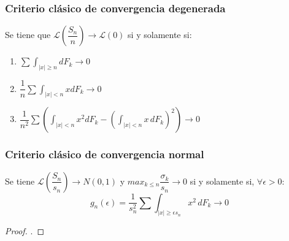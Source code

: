 \subsubsection{Criterio clásico de convergencia degenerada}
Se tiene que $\mathcal{L} \left( \dfrac{S_n}{n} \right)\rightarrow \mathcal{L}(0)$ si y solamente si:
\begin{enumerate}
\item $\sum\displaystyle\int_{|x|\geq n}dF_k \rightarrow 0$
\item $\dfrac{1}{n}\sum\displaystyle\int_{|x|<n} x dF_k \rightarrow 0$
\item $\dfrac{1}{n^2}\sum\left( \displaystyle\int_{|x|<n}x^2 dF_k - \left(  \displaystyle\int_{|x|<n}x\, dF_k \right)^2 \right)\longrightarrow 0$
\end{enumerate}
\subsubsection{Criterio clásico de convergencia normal}
Se tiene $\mathcal{L} \left( \dfrac{S_n}{s_n} \right)\rightarrow N(0,1)$ y $max_{k\leq n}\dfrac{\sigma_k}{s_n}\rightarrow 0$ si y solamente si, $\forall \epsilon >0$:
$$g_n(\epsilon)=\dfrac{1}{s_n^2}\sum\int_{|x|\geq \epsilon s_n}x^2\, dF_k\longrightarrow 0$$
\begin{proof}
.
\end{proof}

